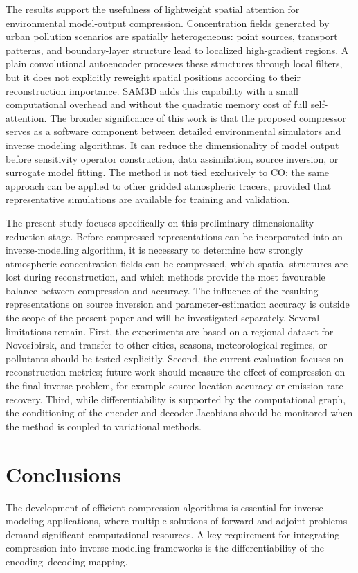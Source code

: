 \documentclass[pdflatex,sn-mathphys-num]{sn-jnl}%
\theoremstyle{thmstyleone}%
\theoremstyle{thmstyletwo}%
\theoremstyle{thmstylethree}%
\begin{document}
The results support the usefulness of lightweight spatial attention for environmental model-output compression. Concentration fields generated by urban pollution scenarios are spatially heterogeneous: point sources, transport patterns, and boundary-layer structure lead to localized high-gradient regions. A plain convolutional autoencoder processes these structures through local filters, but it does not explicitly reweight spatial positions according to their reconstruction importance. SAM3D adds this capability with a small computational overhead and without the quadratic memory cost of full self-attention.
The broader significance of this work is that the proposed compressor serves as a software component between detailed environmental simulators and inverse modeling algorithms. It can reduce the dimensionality of model output before sensitivity operator construction, data assimilation, source inversion, or surrogate model fitting. The method is not tied exclusively to CO: the same approach can be applied to other gridded atmospheric tracers, provided that representative simulations are available for training and validation.

The present study focuses specifically on this preliminary dimensionality-reduction stage. Before compressed representations can be incorporated into an inverse-modelling algorithm, it is necessary to determine how strongly atmospheric concentration fields can be compressed, which spatial structures are lost during reconstruction, and which methods provide the most favourable balance between compression and accuracy. The influence of the resulting representations on source inversion and parameter-estimation accuracy is outside the scope of the present paper and will be investigated separately.
Several limitations remain. First, the experiments are based on a regional dataset for Novosibirsk, and transfer to other cities, seasons, meteorological regimes, or pollutants should be tested explicitly. Second, the current evaluation focuses on reconstruction metrics; future work should measure the effect of compression on the final inverse problem, for example source-location accuracy or emission-rate recovery. Third, while differentiability is supported by the computational graph, the conditioning of the encoder and decoder Jacobians should be monitored when the method is coupled to variational methods.

\section{Conclusions}
The development of efficient compression algorithms is essential for inverse modeling applications, where multiple solutions of forward and adjoint problems demand significant computational resources. A key requirement for integrating compression into inverse modeling frameworks is the differentiability of the encoding–decoding mapping.
\end{document}
